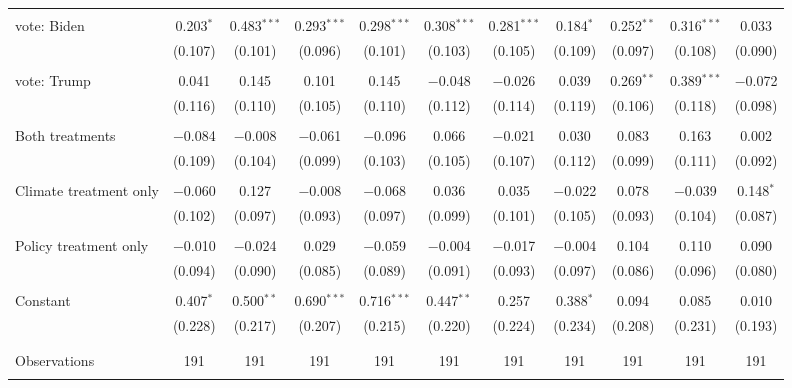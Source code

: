\begin{tabular}{@{\extracolsep{5pt}}lcccccccccc}
  & & & & & & & & & & \\ 
 vote: Biden & 0.203$^{*}$ & 0.483$^{***}$ & 0.293$^{***}$ & 0.298$^{***}$ & 0.308$^{***}$ & 0.281$^{***}$ & 0.184$^{*}$ & 0.252$^{**}$ & 0.316$^{***}$ & 0.033 \\ 
  & (0.107) & (0.101) & (0.096) & (0.101) & (0.103) & (0.105) & (0.109) & (0.097) & (0.108) & (0.090) \\ 
  & & & & & & & & & & \\ 
 vote: Trump & 0.041 & 0.145 & 0.101 & 0.145 & $-$0.048 & $-$0.026 & 0.039 & 0.269$^{**}$ & 0.389$^{***}$ & $-$0.072 \\ 
  & (0.116) & (0.110) & (0.105) & (0.110) & (0.112) & (0.114) & (0.119) & (0.106) & (0.118) & (0.098) \\ 
  & & & & & & & & & & \\ 
 Both treatments & $-$0.084 & $-$0.008 & $-$0.061 & $-$0.096 & 0.066 & $-$0.021 & 0.030 & 0.083 & 0.163 & 0.002 \\ 
  & (0.109) & (0.104) & (0.099) & (0.103) & (0.105) & (0.107) & (0.112) & (0.099) & (0.111) & (0.092) \\ 
  & & & & & & & & & & \\ 
 Climate treatment only & $-$0.060 & 0.127 & $-$0.008 & $-$0.068 & 0.036 & 0.035 & $-$0.022 & 0.078 & $-$0.039 & 0.148$^{*}$ \\ 
  & (0.102) & (0.097) & (0.093) & (0.097) & (0.099) & (0.101) & (0.105) & (0.093) & (0.104) & (0.087) \\ 
  & & & & & & & & & & \\ 
 Policy treatment only & $-$0.010 & $-$0.024 & 0.029 & $-$0.059 & $-$0.004 & $-$0.017 & $-$0.004 & 0.104 & 0.110 & 0.090 \\ 
  & (0.094) & (0.090) & (0.085) & (0.089) & (0.091) & (0.093) & (0.097) & (0.086) & (0.096) & (0.080) \\ 
  & & & & & & & & & & \\ 
 Constant & 0.407$^{*}$ & 0.500$^{**}$ & 0.690$^{***}$ & 0.716$^{***}$ & 0.447$^{**}$ & 0.257 & 0.388$^{*}$ & 0.094 & 0.085 & 0.010 \\ 
  & (0.228) & (0.217) & (0.207) & (0.215) & (0.220) & (0.224) & (0.234) & (0.208) & (0.231) & (0.193) \\ 
  & & & & & & & & & & \\ 
\hline \\[-1.8ex] 

Observations & 191 & 191 & 191 & 191 & 191 & 191 & 191 & 191 & 191 & 191 \\ 
\hline 
\hline \\[-1.8ex] 
\end{tabular} 